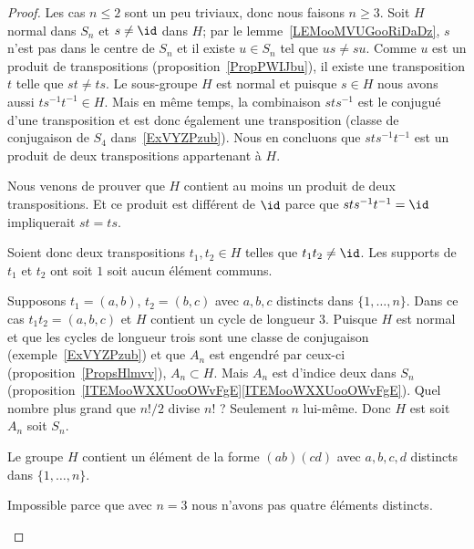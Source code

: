 \begin{proof}
	Les cas \( n\leq 2\) sont un peu triviaux, donc nous faisons \( n\geq 3\). Soit \( H\) normal dans \( S_n\) et \( s\neq \id\) dans \( H\); par le lemme~\ref{LEMooMVUGooRiDaDz}, \( s\) n'est pas dans le centre de \( S_n\) et il existe \( u\in S_n\) tel que \( us\neq su\). Comme \( u\) est un produit de transpositions (proposition~\ref{PropPWIJbu}), il existe une transposition \( t\) telle que \( st\neq ts\). Le sous-groupe \( H\) est normal et puisque \( s\in H\) nous avons aussi \( ts^{-1}t^{-1}\in H\). Mais en même temps, la combinaison \( sts^{-1}\) est le conjugué d'une transposition et est donc également une transposition (classe de conjugaison de \( S_4\) dans~\ref{ExVYZPzub}). Nous en concluons que \( sts^{-1}t^{-1}\) est un produit de deux transpositions appartenant à \( H\).

	Nous venons de prouver que \( H\) contient au moins un produit de deux transpositions. Et ce produit est différent de \( \id\) parce que \( sts^{-1}t^{-1}=\id\) impliquerait \( st=ts\).

	Soient donc deux transpositions \( t_1,t_2\in H\) telles que \( t_1t_2\neq \id\). Les supports de \( t_1\) et \( t_2\) ont soit \( 1\) soit aucun élément communs.

	\begin{subproof}

		Supposons \( t_1=(a,b)\), \( t_2=(b,c)\) avec \( a,b,c\) distincts dans \( \{ 1,\ldots, n \}\). Dans ce cas \( t_1t_2=(a,b,c)\) et \( H\) contient un cycle de longueur \( 3\). Puisque \( H\) est normal et que les cycles de longueur trois sont une classe de conjugaison (exemple~\ref{ExVYZPzub}) et que \( A_n\) est engendré par ceux-ci (proposition~\ref{PropsHlmvv}), \( A_n\subset H\). Mais \( A_n\) est d'indice deux dans \( S_n\) (proposition~\ref{ITEMooWXXUooOWvFgE}\ref{ITEMooWXXUooOWvFgE}). Quel nombre plus grand que \( n!/2\) divise \( n!\) ? Seulement \( n\) lui-même. Donc \( H\) est soit \( A_n\) soit \( S_n\).


		Le groupe \( H\) contient un élément de la forme \( (ab)(cd)\) avec \( a,b,c,d\) distincts dans \( \{ 1,\ldots, n \}\).

		\begin{subproof}

			\spitem[Si \( n=3\)]

			Impossible parce que avec \( n=3\) nous n'avons pas quatre éléments distincts.


\end{subproof}
\end{subproof}
\end{proof}
